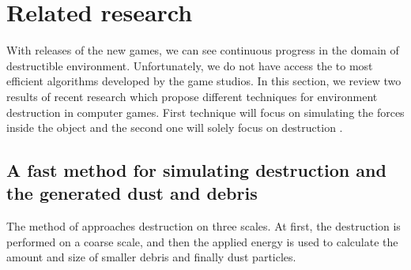 
\section{Related research}
With releases of the new games, we can see continuous progress in the domain of destructible environment. Unfortunately, we do not have access the to most efficient algorithms developed by the game studios. In this section, we review two results of recent research which propose different techniques for environment destruction in computer games. First technique will focus on simulating the forces inside the object and the second one will solely focus on destruction .

\subsection{A fast method for simulating destruction and the generated dust
and debris}
\label{sec:edem}
The method of \citet{edem}  approaches destruction on three scales. At first, the destruction is performed on a coarse scale, and then the applied energy is used to calculate the amount and size of smaller debris and finally dust particles.

